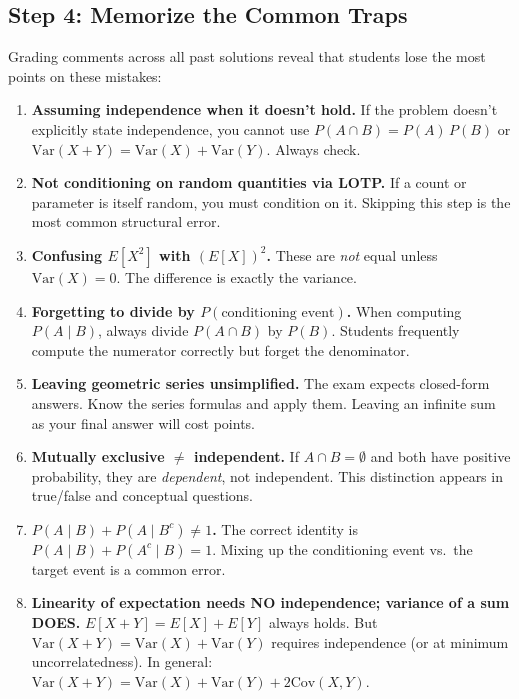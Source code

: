 \documentclass[11pt]{article}
\begin{document}
\subsection{Step 4: Memorize the Common Traps}

Grading comments across all past solutions reveal that students lose the most points on these mistakes:

\begin{enumerate}[label=\textbf{Trap \arabic*:}]

\item \textbf{Assuming independence when it doesn't hold.} If the problem doesn't explicitly state independence, you cannot use $P(A \cap B) = P(A)\,P(B)$ or $\text{Var}(X+Y) = \text{Var}(X) + \text{Var}(Y)$. Always check.

\item \textbf{Not conditioning on random quantities via LOTP.} If a count or parameter is itself random, you must condition on it. Skipping this step is the most common structural error.

\item \textbf{Confusing $E[X^2]$ with $(E[X])^2$.} These are \emph{not} equal unless $\text{Var}(X) = 0$. The difference is exactly the variance.

\item \textbf{Forgetting to divide by $P(\text{conditioning event})$.} When computing $P(A \mid B)$, always divide $P(A \cap B)$ by $P(B)$. Students frequently compute the numerator correctly but forget the denominator.

\item \textbf{Leaving geometric series unsimplified.} The exam expects closed-form answers. Know the series formulas and apply them. Leaving an infinite sum as your final answer will cost points.

\item \textbf{Mutually exclusive $\neq$ independent.} If $A \cap B = \emptyset$ and both have positive probability, they are \emph{dependent}, not independent. This distinction appears in true/false and conceptual questions.

\item \textbf{$P(A \mid B) + P(A \mid B^c) \neq 1$.} The correct identity is $P(A \mid B) + P(A^c \mid B) = 1$. Mixing up the conditioning event vs.\ the target event is a common error.

\item \textbf{Linearity of expectation needs NO independence; variance of a sum DOES.} $E[X+Y] = E[X] + E[Y]$ always holds. But $\text{Var}(X+Y) = \text{Var}(X) + \text{Var}(Y)$ requires independence (or at minimum uncorrelatedness). In general: $\text{Var}(X+Y) = \text{Var}(X) + \text{Var}(Y) + 2\text{Cov}(X,Y)$.

\end{enumerate}
\end{document}
